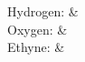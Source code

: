 \documentclass{article}
\begin{document}
  Hydrogen: &  \\

  Oxygen:  &   \\

  Ethyne:  &   

 
\end{document}
